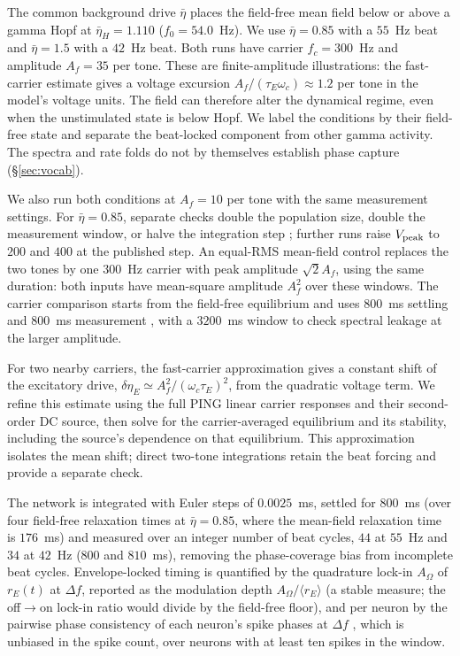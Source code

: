 \documentclass[11pt,a4paper]{article}
\providecommand{\DIFaddtex}[1]{{\protect\color{blue} \sf #1}} %
\providecommand{\DIFaddbegin}{} %
\providecommand{\DIFaddend}{} %
\providecommand{\DIFadd}[1]{\texorpdfstring{\DIFaddtex{#1}}{#1}} %
\begin{document}
The common background drive $\bar\eta$ places the field-free mean field below or
above a gamma Hopf at $\bar\eta_H=1.110$ ($f_0=54.0$~Hz). We use
$\bar\eta=0.85$ with a $55$~Hz beat and $\bar\eta=1.5$ with a $42$~Hz beat.
Both runs have carrier $f_c=300$~Hz and amplitude $A_f=35$ per tone. These are
finite-amplitude illustrations: the fast-carrier estimate gives a voltage excursion
$A_f/(\tau_E\omega_c)\approx1.2$ per tone in the model's voltage units. The field
can therefore alter the dynamical regime, even when the unstimulated state is below
Hopf. We label the conditions by their field-free state and separate the beat-locked
component from other gamma activity. The spectra and rate folds do not by themselves
establish phase capture (\S\ref{sec:vocab}).

We also run both conditions at $A_f=10$ per tone with the same measurement
settings. For $\bar\eta=0.85$, separate checks double the population size,
double the measurement window, or halve the integration step\DIFaddbegin \DIFadd{; further runs raise
$V_{\rm peak}$ to $200$ and $400$ at the published step}\DIFaddend . An equal-RMS
mean-field control replaces the two tones by one $300$~Hz carrier with peak
amplitude $\sqrt{2}A_f$, using the same duration: both inputs have mean-square
amplitude $A_f^2$ over these windows. The carrier comparison starts from the
field-free equilibrium and uses $800$~ms settling and $800$~ms measurement\DIFaddbegin \DIFadd{,
with a $3200$~ms window to check spectral leakage at the larger amplitude}\DIFaddend .

For two nearby carriers, the fast-carrier approximation gives a constant shift
of the excitatory drive, $\delta\eta_E\simeq A_f^2/(\omega_c\tau_E)^2$, from the
quadratic voltage term. We refine this estimate using the full PING linear carrier
responses and their second-order DC source, then solve for the carrier-averaged
equilibrium and its stability, including the source's dependence on that equilibrium.
This approximation isolates the mean shift; direct two-tone integrations retain
the beat forcing and provide a separate check.

The network is integrated with Euler steps of $0.0025$~ms, settled for $800$~ms (over
four field-free relaxation times at $\bar\eta=0.85$, where the mean-field relaxation time is
$176$~ms) and measured over an integer number of beat cycles, $44$ at $55$~Hz and $34$ at
$42$~Hz ($800$ and $810$~ms), removing the phase-coverage bias from incomplete
beat cycles. Envelope-locked timing is quantified by the quadrature lock-in $A_\Omega$ of
$r_E(t)$ at $\Delta f$, reported as the modulation depth $A_\Omega/\langle r_E\rangle$ (a
stable measure; the off$\to$on lock-in ratio would divide by the field-free floor), and
per neuron by the pairwise phase consistency of each neuron's spike phases at $\Delta f$
\cite{vinck2010}, which is unbiased in the spike count, over neurons with at least ten
spikes in the window.
\end{document}
